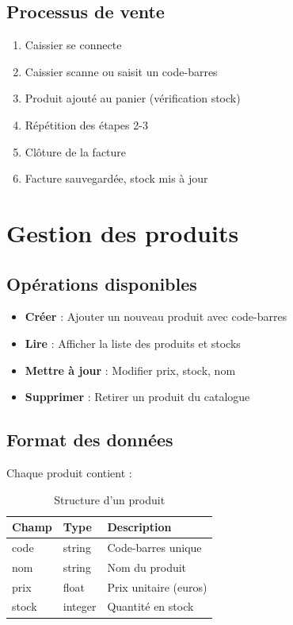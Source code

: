 \documentclass[12pt,a4paper,french]{report}
\begin{document}
\subsection{Processus de vente}

\begin{enumerate}
    \item Caissier se connecte
    \item Caissier scanne ou saisit un code-barres
    \item Produit ajouté au panier (vérification stock)
    \item Répétition des étapes 2-3
    \item Clôture de la facture
    \item Facture sauvegardée, stock mis à jour
\end{enumerate}

\section{Gestion des produits}

\subsection{Opérations disponibles}

\begin{itemize}
    \item \textbf{Créer} : Ajouter un nouveau produit avec code-barres
    \item \textbf{Lire} : Afficher la liste des produits et stocks
    \item \textbf{Mettre à jour} : Modifier prix, stock, nom
    \item \textbf{Supprimer} : Retirer un produit du catalogue
\end{itemize}

\subsection{Format des données}

Chaque produit contient :

\begin{table}[H]
\centering
\begin{tabular}{|l|l|l|}
\hline
\textbf{Champ} & \textbf{Type} & \textbf{Description} \\
\hline
code & string & Code-barres unique \\
nom & string & Nom du produit \\
prix & float & Prix unitaire (euros) \\
stock & integer & Quantité en stock \\
\hline
\end{tabular}
\caption{Structure d'un produit}
\end{table}
\end{document}
